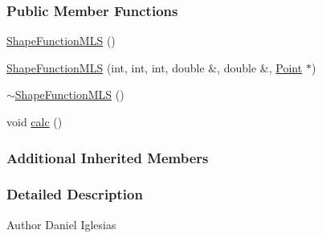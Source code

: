 \subsubsection*{Public Member Functions}
\begin{DoxyCompactItemize}
\item 
\hyperlink{classmknix_1_1_shape_function_m_l_s_a4f54b158c12126b557284995ee1ae561}{Shape\-Function\-M\-L\-S} ()
\item 
\hyperlink{classmknix_1_1_shape_function_m_l_s_aa650080de7f2243efce2e14c17e9e2c5}{Shape\-Function\-M\-L\-S} (int, int, int, double \&, double \&, \hyperlink{classmknix_1_1_point}{Point} $\ast$)
\item 
\hyperlink{classmknix_1_1_shape_function_m_l_s_a023ccf7cbc4ad50738271c4807c5f32a}{$\sim$\-Shape\-Function\-M\-L\-S} ()
\item 
void \hyperlink{classmknix_1_1_shape_function_m_l_s_a45b9a5887f30125379ec7ba0ed6fb8c9}{calc} ()
\end{DoxyCompactItemize}
\subsubsection*{Additional Inherited Members}


\subsubsection{Detailed Description}
\begin{DoxyAuthor}{Author}
Daniel Iglesias 
\end{DoxyAuthor}


